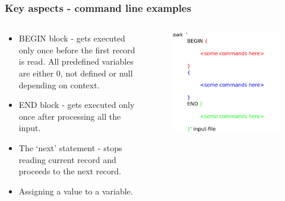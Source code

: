 \documentclass[xcolor=svgnames]{beamer}
\begin{document}
\begin{frame}
    \frametitle{Key aspects - command line examples}
    \begin{columns}
        \begin{column}[T]{7cm}
            \begin{itemize}
                \item BEGIN block - gets executed only once before the first record is read. All predefined variables are either 0, not defined or null depending on context.
                \item END block - gets executed only once after processing all the input.
                \item The `next' statement - stops reading current record and proceeds to the next record.
                \item Assigning a value to a variable.
            \end{itemize}
        \end{column}
        \begin{column}[T]{4cm}
            \begin{figure}
                \begin{center}
                    \includegraphics[scale=0.22,keepaspectratio]{awkSingleInput.png}
                \end{center}
            \end{figure}
        \end{column}
    \end{columns}

\end{frame}
\end{document}
